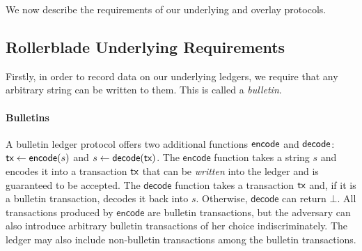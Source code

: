 %
%

We now describe the requirements of our underlying and overlay protocols.

\subsection{Rollerblade Underlying Requirements}

Firstly, in order to record data on our underlying ledgers, we require that any arbitrary string
can be written to them. This is called a \emph{bulletin}.

\paragraph{Bulletins}
A bulletin ledger protocol offers two additional
functions $\textsf{encode}$ and $\textsf{decode}$:
$\textsf{tx} \gets \textsf{encode}(s)$ and $s \gets \textsf{decode}(\textsf{tx})$.
The $\textsf{encode}$ function takes a string $s$ and encodes it into a transaction $\textsf{tx}$ that can be \emph{written}
into the ledger and is guaranteed to be accepted.
The $\textsf{decode}$ function takes a transaction $\textsf{tx}$
and, if it is a bulletin transaction, decodes it back into $s$.
Otherwise, $\textsf{decode}$ can return $\bot$.
All transactions produced by $\textsf{encode}$
are bulletin transactions, but the adversary can also introduce arbitrary bulletin transactions of her choice
indiscriminately. The ledger may also include non-bulletin transactions among the bulletin transactions.


